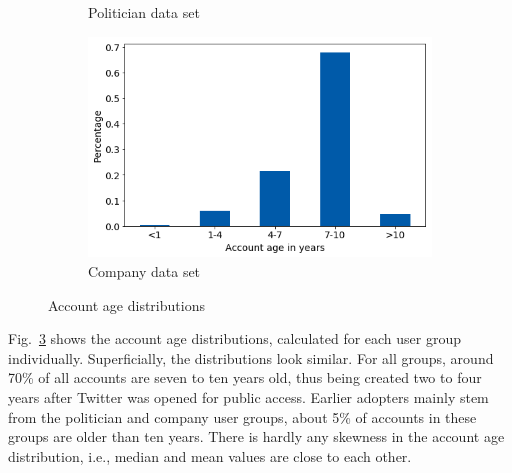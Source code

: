 \begin{figure}[h]
\begin{subfigure}{.33\textwidth}
  \caption{Politician data set}
  \label{fig:age_distr_sub2}
\end{subfigure}
\begin{subfigure}{.33\textwidth}
  \includegraphics[width=.95\linewidth]{img/corp_age_distr}
  \caption{Company data set}
  \label{fig:age_distr_sub3}
\end{subfigure}%
\caption{Account age distributions}
\label{fig:age_distr}
\end{figure}

Fig.~\ref{fig:age_distr} shows the account age distributions, calculated for
each user group individually.
Superficially, the distributions look similar.
For all groups, around 70\% of all accounts are seven to ten years old, thus being
created two to four years after Twitter was opened for public access.
Earlier adopters mainly stem from the politician and company user groups, about
5\% of accounts in these groups are older than ten years.
There is hardly any skewness in the account age distribution, i.e., median and
mean values are close to each other.

